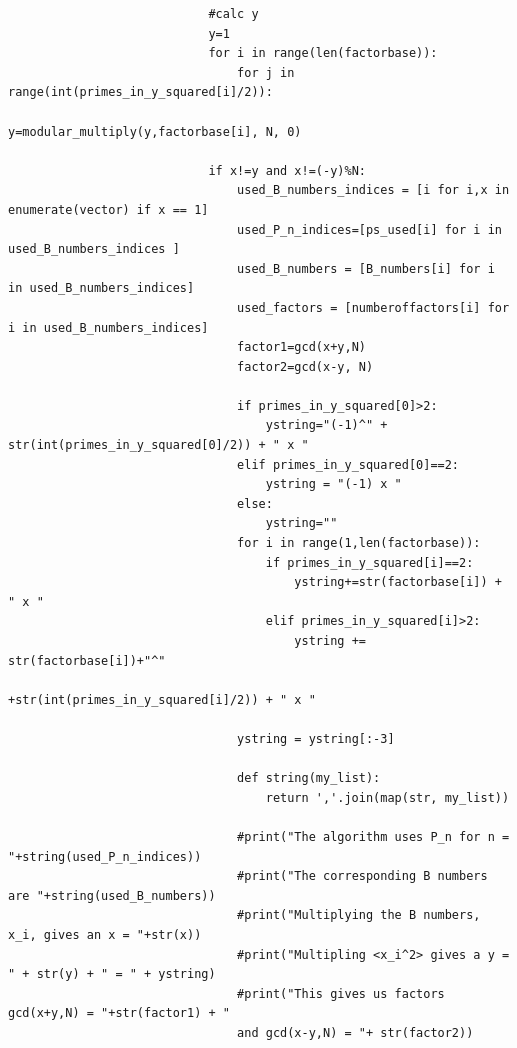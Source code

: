\documentclass[10pt,a4paper]{report}
\begin{document}
\begin{verbatim}
                            #calc y
                            y=1
                            for i in range(len(factorbase)):
                                for j in range(int(primes_in_y_squared[i]/2)):
                                    y=modular_multiply(y,factorbase[i], N, 0)

                            if x!=y and x!=(-y)%N:
                                used_B_numbers_indices = [i for i,x in enumerate(vector) if x == 1]
                                used_P_n_indices=[ps_used[i] for i in used_B_numbers_indices ]
                                used_B_numbers = [B_numbers[i] for i in used_B_numbers_indices]
                                used_factors = [numberoffactors[i] for i in used_B_numbers_indices]
                                factor1=gcd(x+y,N)
                                factor2=gcd(x-y, N)

                                if primes_in_y_squared[0]>2:
                                    ystring="(-1)^" + str(int(primes_in_y_squared[0]/2)) + " x "
                                elif primes_in_y_squared[0]==2:
                                    ystring = "(-1) x "
                                else:
                                    ystring=""
                                for i in range(1,len(factorbase)):
                                    if primes_in_y_squared[i]==2:
                                        ystring+=str(factorbase[i]) + " x "
                                    elif primes_in_y_squared[i]>2:
                                        ystring += str(factorbase[i])+"^"
                                        +str(int(primes_in_y_squared[i]/2)) + " x "

                                ystring = ystring[:-3]

                                def string(my_list):
                                    return ','.join(map(str, my_list))

                                #print("The algorithm uses P_n for n = "+string(used_P_n_indices))
                                #print("The corresponding B numbers are "+string(used_B_numbers))
                                #print("Multiplying the B numbers, x_i, gives an x = "+str(x))
                                #print("Multipling <x_i^2> gives a y = " + str(y) + " = " + ystring)
                                #print("This gives us factors gcd(x+y,N) = "+str(factor1) + " 
                                and gcd(x-y,N) = "+ str(factor2))


\end{verbatim}
\end{document}
